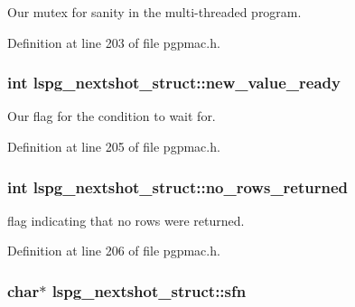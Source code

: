 Our mutex for sanity in the multi-\/threaded program. 



Definition at line 203 of file pgpmac.\-h.

\hypertarget{structlspg__nextshot__struct_adb8da14444b98f556dba9420dd4666dc}{
\subsubsection[{new\-\_\-value\-\_\-ready}]{\setlength{\rightskip}{0pt plus 5cm}int lspg\-\_\-nextshot\-\_\-struct\-::new\-\_\-value\-\_\-ready}}\label{structlspg__nextshot__struct_adb8da14444b98f556dba9420dd4666dc}


Our flag for the condition to wait for. 



Definition at line 205 of file pgpmac.\-h.

\hypertarget{structlspg__nextshot__struct_abc9242805729f70b83df79706c394c71}{
\subsubsection[{no\-\_\-rows\-\_\-returned}]{\setlength{\rightskip}{0pt plus 5cm}int lspg\-\_\-nextshot\-\_\-struct\-::no\-\_\-rows\-\_\-returned}}\label{structlspg__nextshot__struct_abc9242805729f70b83df79706c394c71}


flag indicating that no rows were returned. 



Definition at line 206 of file pgpmac.\-h.

\hypertarget{structlspg__nextshot__struct_a03252bba597b081edc9d08b20b558cc7}{
\subsubsection[{sfn}]{\setlength{\rightskip}{0pt plus 5cm}char$\ast$ lspg\-\_\-nextshot\-\_\-struct\-::sfn}}\label{structlspg__nextshot__struct_a03252bba597b081edc9d08b20b558cc7}


